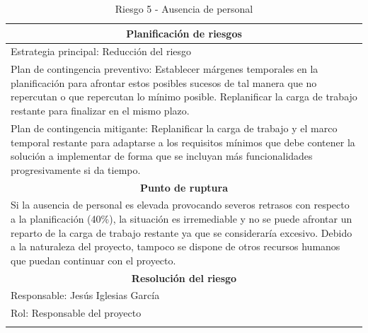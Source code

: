 \documentclass[12pt,a4paper, twoside]{report}
\begin{document}
\begin{longtable}{m{4cm}|m{5cm}|m{4cm}}
		\multicolumn{3}{|c|}{\textbf{Planificación de riesgos}} \\ \hline \hline
		\multicolumn{3}{|p{17cm}|}{Estrategia principal: Reducción del riesgo} \\ \hline
		\multicolumn{3}{|p{17cm}|}{Plan de contingencia preventivo: Establecer márgenes temporales en la planificación para afrontar estos posibles sucesos de tal manera que no repercutan o que repercutan lo mínimo posible. Replanificar la carga de trabajo restante para finalizar en el mismo plazo.} \\ \hline
		\multicolumn{3}{|p{17cm}|}{Plan de contingencia mitigante: Replanificar la carga de trabajo y el marco temporal restante para adaptarse a los requisitos mínimos que debe contener la solución a implementar de forma que se incluyan más funcionalidades progresivamente si da tiempo.} \\ \hline
			
		\multicolumn{3}{|c|}{\textbf{Punto de ruptura}} \\ \hline \hline
		\multicolumn{3}{|p{17cm}|}{Si la ausencia de personal es elevada provocando severos retrasos con respecto a la planificación (40\%), la situación es irremediable y no se puede afrontar un reparto de la carga de trabajo restante ya que se consideraría excesivo. Debido a la naturaleza del proyecto, tampoco se dispone de otros recursos humanos que puedan continuar con el proyecto.}\\ \hline
			
		\multicolumn{3}{|c|}{\textbf{Resolución del riesgo}} \\ \hline \hline
		\multicolumn{3}{|p{17cm}|}{Responsable: Jesús Iglesias García}\\ \hline
		\multicolumn{3}{|p{17cm}|}{Rol: Responsable del proyecto} \\ \hline
		\caption{Riesgo 5 - Ausencia de personal}
	\end{longtable}
	
	\newpage
							
\end{document}
